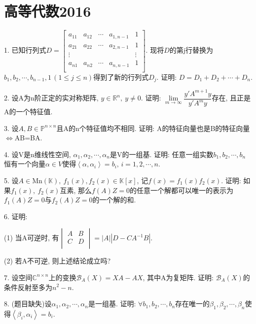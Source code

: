 \documentclass[12pt, a4paper, twoside]{ctexart}%
\begin{document}
	\clearpage
	\section{高等代数2016}
	1. 已知行列式$D=\begin{bmatrix}
		a_{11}&a_{12}&\cdots&a_{1,n-1}&1\\
		a_{21}&a_{22}&\cdots&a_{2,n-1}&1\\
		\vdots& & & &\vdots \\
		a_{n1}&a_{n2}&\cdots&a_{n,n-1}&1\\
	\end{bmatrix}$. 现将$D$的第j行替换为$b_1,b_2,\cdots,b_{n-1},1\,(1\leq j\leq n)$得到了新的行列式$D_j$. 证明: $D=D_1+D_2+\cdots+D_n.$\par 
	2. 设A为n阶正定的实对称矩阵, $y\in\mathbb{R}^n,\ y\neq0$. 证明: $\lim\limits_{m\to \infty}\dfrac{y'A^{m+1}y}{y'A^my}$存在, 
	且正是A的一个特征值.\par
	3. 设$A,B\in\mathbb{P}^{n\times n}$且A的n个特征值均不相同. 证明: A的特征向量也是B的特征向量$\iff$AB=BA.\par
	4. 设V是n维线性空间, $\alpha_1,\alpha_2,\cdots,\alpha_n$是V的一组基. 证明: 任意一组实数$b_1, b_2,\cdots,b_n$恒有一个向量$\alpha\in V$使得$\left<\alpha,\alpha_i\right>=b_i,\,i=1,2,\cdots,n.$\par 
	5. 设$A\in \mathrm{Mn}(\mathbb{K}),\ f_1(x),f_2(x)\in \mathbb{K}[x]$, 记$f(x)=f_1(x)f_2(x)$. 证明: 如果$f_1(x),\ f_2(x)$互素, 那么$f(A)Z=0$的任意一个解都可以唯一的表示为$f_1(A)Z=0$与$f_2(A)Z=0$的一个解的和.\par
	6. 证明: \par 
	\hspace{1.2em}(1) 当A可逆时, 有$\begin{vmatrix}
		A&B\\
		C&D\\
	\end{vmatrix}=\left|A\right|\left|D-CA^{-1}B\right|.$\par
	\hspace{1.2em}(2) 若A不可逆, 则上述结论成立吗?\par 
	7. 设空间$\mathbb{C}^{n\times n}$上的变换$\mathscr{B}_A(X)=XA-AX$, 其中A为复矩阵. 证明: $\mathscr{B}_A(X)$的条件反射至多为$n^2-n.$\par 
	8. (题目缺失)设$\alpha_1,\alpha_2,\cdots,\alpha_n$是一组基. 证明: $\forall b_1,b_2,\cdots,b_n$存在唯一的$\beta_1,\beta_2,\cdots,\beta_n$使得$\left<\beta_i,\alpha_i\right>=b_i.$\par 
	
\end{document}
